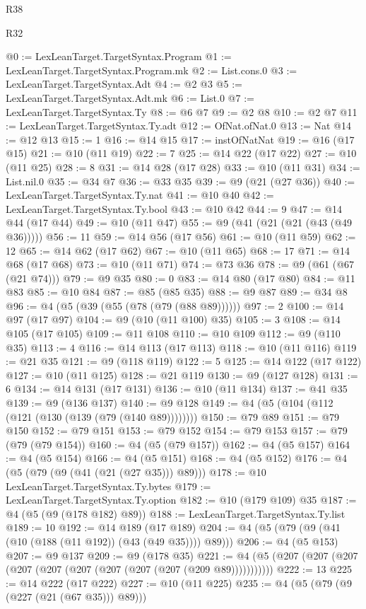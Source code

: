 \begin{lexlean}{R38}
\begin{lexlean}{R32}
\begin{coremodule}
{{{{{{{{{{{{{{{{{{{{{{{{{{{{{{{{{{{{{{{{{{{{{{{{{{{@0 := LexLeanTarget.TargetSyntax.Program
@1 := LexLeanTarget.TargetSyntax.Program.mk
@2 := List.cons.{0}
@3 := LexLeanTarget.TargetSyntax.Adt
@4 := @2 @3
@5 := LexLeanTarget.TargetSyntax.Adt.mk
@6 := List.{0}
@7 := LexLeanTarget.TargetSyntax.Ty
@8 := @6 @7
@9 := @2 @8
@10 := @2 @7
@11 := LexLeanTarget.TargetSyntax.Ty.adt
@12 := OfNat.ofNat.{0}
@13 := Nat
@14 := @12 @13
@15 := 1
@16 := @14 @15
@17 := instOfNatNat
@19 := @16 (@17 @15)
@21 := @10 (@11 @19)
@22 := 7
@25 := @14 @22 (@17 @22)
@27 := @10 (@11 @25)
@28 := 8
@31 := @14 @28 (@17 @28)
@33 := @10 (@11 @31)
@34 := List.nil.{0}
@35 := @34 @7
@36 := @33 @35
@39 := @9 (@21 (@27 @36))
@40 := LexLeanTarget.TargetSyntax.Ty.nat
@41 := @10 @40
@42 := LexLeanTarget.TargetSyntax.Ty.bool
@43 := @10 @42
@44 := 9
@47 := @14 @44 (@17 @44)
@49 := @10 (@11 @47)
@55 := @9 (@41 (@21 (@21 (@43 (@49 @36)))))
@56 := 11
@59 := @14 @56 (@17 @56)
@61 := @10 (@11 @59)
@62 := 12
@65 := @14 @62 (@17 @62)
@67 := @10 (@11 @65)
@68 := 17
@71 := @14 @68 (@17 @68)
@73 := @10 (@11 @71)
@74 := @73 @36
@78 := @9 (@61 (@67 (@21 @74)))
@79 := @9 @35
@80 := 0
@83 := @14 @80 (@17 @80)
@84 := @11 @83
@85 := @10 @84
@87 := @85 (@85 @35)
@88 := @9 @87
@89 := @34 @8
@96 := @4 (@5 (@39 (@55 (@78 (@79 (@88 @89))))))
@97 := 2
@100 := @14 @97 (@17 @97)
@104 := @9 (@10 (@11 @100) @35)
@105 := 3
@108 := @14 @105 (@17 @105)
@109 := @11 @108
@110 := @10 @109
@112 := @9 (@110 @35)
@113 := 4
@116 := @14 @113 (@17 @113)
@118 := @10 (@11 @116)
@119 := @21 @35
@121 := @9 (@118 @119)
@122 := 5
@125 := @14 @122 (@17 @122)
@127 := @10 (@11 @125)
@128 := @21 @119
@130 := @9 (@127 @128)
@131 := 6
@134 := @14 @131 (@17 @131)
@136 := @10 (@11 @134)
@137 := @41 @35
@139 := @9 (@136 @137)
@140 := @9 @128
@149 := @4 (@5 (@104 (@112 (@121 (@130 (@139 (@79 (@140 @89))))))))
@150 := @79 @89
@151 := @79 @150
@152 := @79 @151
@153 := @79 @152
@154 := @79 @153
@157 := @79 (@79 (@79 @154))
@160 := @4 (@5 (@79 @157))
@162 := @4 (@5 @157)
@164 := @4 (@5 @154)
@166 := @4 (@5 @151)
@168 := @4 (@5 @152)
@176 := @4 (@5 (@79 (@9 (@41 (@21 (@27 @35))) @89)))
@178 := @10 LexLeanTarget.TargetSyntax.Ty.bytes
@179 := LexLeanTarget.TargetSyntax.Ty.option
@182 := @10 (@179 @109) @35
@187 := @4 (@5 (@9 (@178 @182) @89))
@188 := LexLeanTarget.TargetSyntax.Ty.list
@189 := 10
@192 := @14 @189 (@17 @189)
@204 := @4 (@5 (@79 (@9 (@41 (@10 (@188 (@11 @192)) (@43 (@49 @35)))) @89)))
@206 := @4 (@5 @153)
@207 := @9 @137
@209 := @9 (@178 @35)
@221 := @4 (@5 (@207 (@207 (@207 (@207 (@207 (@207 (@207 (@207 (@207 (@209 @89)))))))))))
@222 := 13
@225 := @14 @222 (@17 @222)
@227 := @10 (@11 @225)
@235 := @4 (@5 (@79 (@9 (@227 (@21 (@67 @35))) @89)))
}}}}}}}}}}}}}}}}}}}}}}}}}}}}}}}}}}}}}}}}}}}}}}}}}}}
\end{coremodule}
\end{lexlean}
\end{lexlean}

